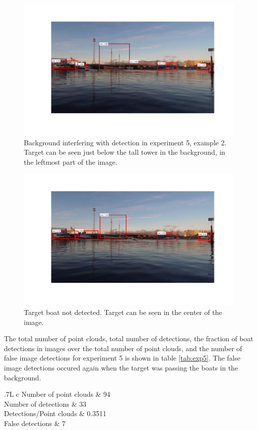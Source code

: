 \begin{figure}[h]
	\centering
	\includegraphics[width=\linewidth]{fig/ex5_multiple.png}
	\caption{Background interfering with detection in experiment 5, example 2. Target can be seen just below the tall tower in the background, in the leftmost part of the image.}
	\label{fig:ex5_multiple_2}
\end{figure}%
\begin{figure}[H]
		\centering
		\includegraphics[width=\linewidth]{fig/ex5_no_hit.png}
		\caption{Target boat not detected. Target can be seen in the center of the image.}
		\label{fig:ex5_miss}
\end{figure}%

The total number of point clouds, total number of detections, the fraction of boat detections in images over the total number of point clouds, and the number of false image detections for experiment 5 is shown in table \ref{tab:exp5}. The false image detections occured again when the target was passing the boats in the background.
\begin{table}[H]
	\centering
	\begin{tabularx}{.7\linewidth}{L c}
		\toprule
		Number of point clouds & 94\\
		\midrule
		Number of detections & 33\\
		\midrule
		Detections/Point clouds & 0.3511 \\
		\midrule
		False detections & 7\\
		\bottomrule
	\end{tabularx}
	\caption{Data from experiment 5.}
	\label{tab:exp5}
\end{table}

